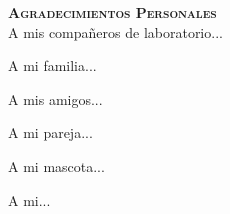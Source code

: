 \newpage
    \begin{center}
        {\LARGE \textbf{\textsc{Agradecimientos Personales}}}\\[0.5cm]

        A mis compañeros de laboratorio...

        A mi familia...

        A mis amigos...

        A mi pareja...

        A mi mascota...

        A mi...

    \end{center}